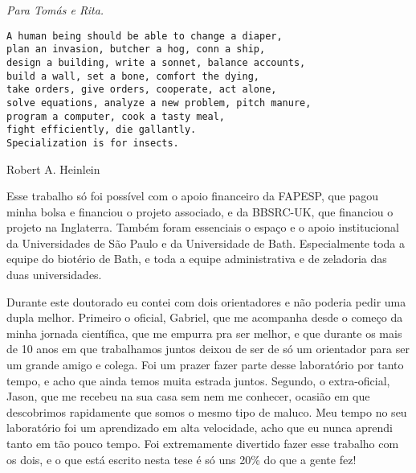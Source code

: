 \newpage

\vspace*{0.75\textheight}
\begin{flushright}
  \emph{Para Tomás e Rita.}
\end{flushright}

\newpage

\vspace*{0.4\textheight}
\noindent{\LARGE\textbf{}}
\begin{verbatim}
A human being should be able to change a diaper, 
plan an invasion, butcher a hog, conn a ship,
design a building, write a sonnet, balance accounts, 
build a wall, set a bone, comfort the dying, 
take orders, give orders, cooperate, act alone, 
solve equations, analyze a new problem, pitch manure, 
program a computer, cook a tasty meal, 
fight efficiently, die gallantly. 
Specialization is for insects.
\end{verbatim}
\begin{flushright}
Robert A. Heinlein
\end{flushright}

\newpage


\doublespacing


\onehalfspacing
\noindent
Esse trabalho só foi possível com o apoio financeiro da FAPESP, que pagou minha bolsa e financiou o projeto associado, e da BBSRC-UK, que financiou o projeto na Inglaterra. Também foram essenciais o espaço e o apoio institucional da Universidades de São Paulo e da Universidade de Bath. Especialmente toda a equipe do biotério de Bath, e toda a equipe administrativa e de zeladoria das duas universidades. 

Durante este doutorado eu contei com dois orientadores e não poderia pedir uma dupla melhor. Primeiro o oficial, Gabriel, que me acompanha desde o começo da minha jornada científica, que me empurra pra ser melhor, e que durante os mais de 10 anos em que trabalhamos juntos deixou de ser de só um orientador para ser um grande amigo e colega. Foi um prazer fazer parte desse laboratório por tanto tempo, e acho que ainda temos muita estrada juntos. Segundo, o extra-oficial, Jason, que me recebeu na sua casa sem nem me conhecer, ocasião em que descobrimos rapidamente que somos o mesmo tipo de maluco. Meu tempo no seu laboratório foi um aprendizado em alta velocidade, acho que eu nunca aprendi tanto em tão pouco tempo. Foi extremamente divertido fazer esse trabalho com os dois, e o que está escrito nesta tese é só uns 20\% do que a gente fez! 

